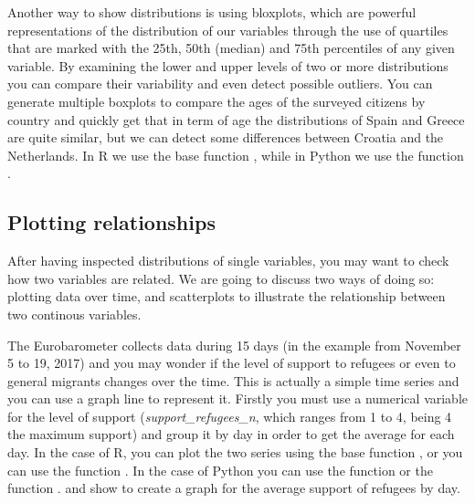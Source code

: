 Another way to show distributions is using bloxplots, which are powerful representations of the distribution of our variables through the use of quartiles that are marked with the 25th, 50th (median) and 75th percentiles of any given variable. By examining the lower and upper levels of two or more distributions you can compare their variability and even detect possible outliers. You can generate multiple boxplots to compare the ages of the surveyed citizens by country and quickly get that in term of age the distributions of Spain and Greece are quite similar, but we can detect some differences between Croatia and the Netherlands. In R we use the base function , while in Python we use the  function .





\subsection{Plotting relationships}

After having inspected distributions of single variables, you may want to check how two variables are related. We are going to discuss two ways of doing so: plotting data over time, and scatterplots to illustrate the relationship between two continous variables.

The Eurobarometer collects data during 15 days (in the example from November 5 to 19, 2017) and you may wonder if the level of support to refugees or even to general migrants changes over the time. This is actually a simple time series and you can use a graph line to represent it. Firstly you must use a numerical variable for the level of support (\emph{support\_refugees\_n}, which ranges from 1 to 4, being 4 the maximum support) and group it by day in order to get the average for each day. In the case of R, you can plot the two series using the base function , or you can use the  function . In the case of Python you can use the  function  or the  function . and  show to create a graph for the average support of refugees by day.



